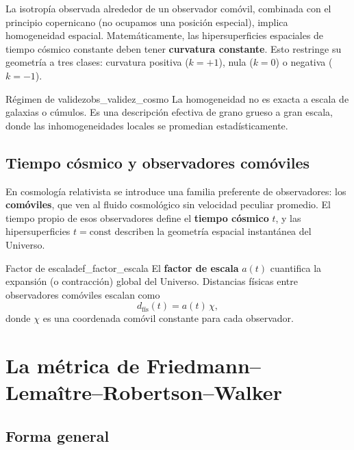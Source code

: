 La isotropía observada alrededor de un observador comóvil, combinada con el principio copernicano (no ocupamos una posición especial), implica homogeneidad espacial. Matemáticamente, las hipersuperficies espaciales de tiempo cósmico constante deben tener \textbf{curvatura constante}. Esto restringe su geometría a tres clases: curvatura positiva ($k=+1$), nula ($k=0$) o negativa ($k=-1$).

\begin{observacion}{Régimen de validez}{obs_validez_cosmo}
La homogeneidad no es exacta a escala de galaxias o cúmulos. Es una descripción efectiva de grano grueso a gran escala, donde las inhomogeneidades locales se promedian estadísticamente.
\end{observacion}

\subsection{Tiempo cósmico y observadores comóviles}

En cosmología relativista se introduce una familia preferente de observadores: los \textbf{comóviles}, que ven al fluido cosmológico sin velocidad peculiar promedio. El tiempo propio de esos observadores define el \textbf{tiempo cósmico} $t$, y las hipersuperficies $t=\text{const}$ describen la geometría espacial instantánea del Universo.

\begin{definicion}{Factor de escala}{def_factor_escala}
El \textbf{factor de escala} $a(t)$ cuantifica la expansión (o contracción) global del Universo. Distancias físicas entre observadores comóviles escalan como
\begin{equation}
  d_{\text{fís}}(t) = a(t)\,\chi,
\end{equation}
donde $\chi$ es una coordenada comóvil constante para cada observador.
\end{definicion}

\section{La métrica de Friedmann--Lemaître--Robertson--Walker}
\label{sec:metrica_flrw}

\subsection{Forma general}

